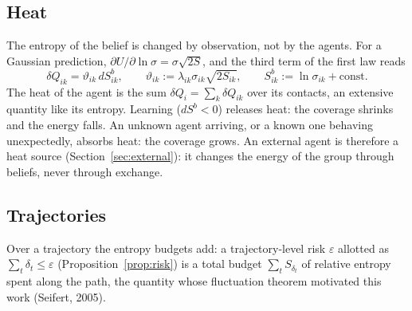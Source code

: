 \documentclass[11pt]{article}
\theoremstyle{definition}
\theoremstyle{remark}
\begin{document}
\subsection{Heat}\label{sec:heat}
The entropy of the belief is changed by observation, not by the agents. For a Gaussian prediction, $\partial U/\partial\ln\sigma=\sigma\sqrt{2S}$, and the third term of the first law reads
\[
\delta Q_{ik}=\vartheta_{ik}\,dS^b_{ik},\qquad \vartheta_{ik}:=\lambda_{ik}\sigma_{ik}\sqrt{2S_{ik}},\qquad S^b_{ik}:=\ln\sigma_{ik}+\mathrm{const}.
\]
The heat of the agent is the sum $\delta Q_i=\sum_k\delta Q_{ik}$ over its contacts, an extensive quantity like its entropy. Learning ($dS^b<0$) releases heat: the coverage shrinks and the energy falls. An unknown agent arriving, or a known one behaving unexpectedly, absorbs heat: the coverage grows. An external agent is therefore a heat source (Section~\ref{sec:external}): it changes the energy of the group through beliefs, never through exchange.

\subsection{Trajectories}
Over a trajectory the entropy budgets add: a trajectory-level risk $\varepsilon$ allotted as $\sum_t\delta_t\le\varepsilon$ (Proposition~\ref{prop:risk}) is a total budget $\sum_tS_{\delta_t}$ of relative entropy spent along the path, the quantity whose fluctuation theorem motivated this work (Seifert, 2005).
\end{document}
